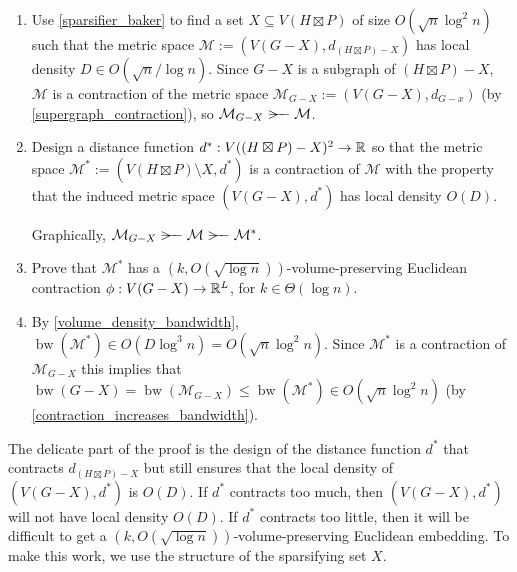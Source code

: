 \documentclass{patmorin}
\renewcommand{\le}{\leqslant}
\DeclareMathOperator{\bw}{bw}
\begin{document}
\begin{enumerate}
  \item Use \cref{sparsifier_baker} to find a set $X\subseteq V(H\boxtimes P)$ of size $O(\sqrt{n}\log^2 n)$ such that the metric space $\mathcal{M}:=(V(G-X),d_{(H\boxtimes P)-X})$ has local density $D\in O(\sqrt{n}/\log n)$.  Since $G-X$ is a subgraph of $(H\boxtimes P)-X$, $\mathcal{M}$ is a contraction of the metric space $\mathcal{M}_{G-X}:=(V(G-X),d_{G-x})$ (by \cref{supergraph_contraction}), so $\mathcal{M}_{G-X}\rightbroom\mathcal{M}$.

  \item Design a distance function $d^*:V((H\boxtimes P)-X)^2\to\mathbb{R}$ so that the metric space $\mathcal{M}^*:=(V(H\boxtimes P)\setminus X,d^*)$ is a contraction of $\mathcal{M}$ with the property that the induced metric space $(V(G-X),d^*)$ has local density $O(D)$.

  Graphically, $\mathcal{M}_{G-X}\rightbroom\mathcal{M}\rightbroom\mathcal{M}^*$.

  \item Prove that $\mathcal{M}^*$ has a $(k,O(\sqrt{\log n}))$-volume-preserving Euclidean contraction $\phi:V(G-X)\to\mathbb{R}^L$, for $k\in\Theta(\log n)$.


  \item
   By \cref{volume_density_bandwidth},  $\bw(\mathcal{M}^*)\in O(D\log^3 n)=O(\sqrt{n}\log^2 n)$.  Since $\mathcal{M}^*$ is a contraction of $\mathcal{M}_{G-X}$ this implies that $\bw(G-X)=\bw(\mathcal{M}_{G-X}) \le \bw(\mathcal{M}^*)\in O(\sqrt{n}\log^2 n)$ (by \cref{contraction_increases_bandwidth}).
\end{enumerate}

The delicate part of the proof is the design of the distance function $d^*$ that contracts $d_{(H\boxtimes P)-X}$ but still ensures that the local density of $(V(G-X),d^*)$ is $O(D)$. If $d^*$ contracts too much, then $(V(G-X),d^*)$ will not have local density $O(D)$. If $d^*$ contracts too little, then it will be difficult to get a $(k,O(\sqrt{\log n}))$-volume-preserving Euclidean embedding. To make this work, we use the structure of the sparsifying set $X$.
\end{document}
